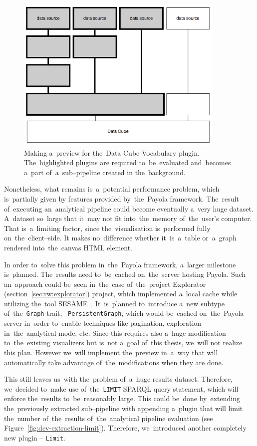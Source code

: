 \begin{figure}
	\centering
	\includegraphics[width=100mm]{img/dcv-extraction.png}
	\caption{Making a~preview for the~Data Cube Vocabulary plugin. The~highlighted
	plugins are required to~be~evaluated and~becomes a~part of~a~sub--pipeline created
	in the~background.}
	\label{fig:dcv-extraction}
\end{figure}

Nonetheless, what remains is~a~potential performance problem, which is~partially given 
by features provided by~the~Payola framework. The~result of~executing an~analytical pipeline could become eventually a~very huge dataset. A~dataset so~large that it~may not fit into~the~memory of~the~user's computer. That is~a~limiting factor, since the~visualisation is~performed fully on~the~client--side. 
It makes no~difference whether it~is~a~table or~a~graph rendered into~the~canvas HTML element.

In order to~solve this problem in~the~Payola framework, a~larger milestone is~planned. The~results need to~be~cached on~the~server hosting Payola.
Such an~approach could be~seen in~the~case of~the~project 
Explorator (section~\ref{sec:rw:explorator}) project, which implemented a~local cache
while utilizing the~tool SESAME~\cite{sesame}. It~is~planned to~introduce a~new 
subtype of~the~\texttt{Graph} trait, ~\texttt{PersistentGraph}, which would be~cached on~the~Payola server in~order to~enable techniques like pagination, 
exploration in~the~analytical mode, etc. Since this requires also a~huge 
modification to~the~existing visualizers but is~not a~goal of~this thesis, we~will 
not realize this plan. However we~will implement the~preview in~a~way that will 
automatically take advantage of~the~modifications when they are done.

This still leaves us~with the~problem of~a~huge results dataset. Therefore, we~decided to~make use of~the~\texttt{LIMIT} SPARQL query statement, which will 
enforce the~results to~be~reasonably large. This could be~done by~extending the~previously extracted sub--pipeline with appending a~plugin that 
will limit the~number of~the~results of~the~analytical
pipeline evaluation (see Figure~\ref{fig:dcv-extraction-limit}). Therefore, we~introduced another completely new plugin -- \texttt{Limit}.

